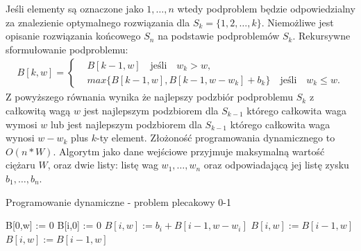 Jeśli elementy są oznaczone jako $1,\dots,n$ wtedy podproblem będzie odpowiedzialny za znalezienie optymalnego rozwiązania dla $S_k = \{1,2,\dots,k \}$. Niemożliwe jest opisanie rozwiązania końcowego $S_n$ na podstawie podproblemów $S_k$. Rekursywne sformułowanie podproblemu:
\begin{equation}\label{recursiveDynamic}
  \begin{aligned}
    B[k,w] =
    \begin{cases}
    & B[k-1,w] \quad \textrm{jeśli} \quad w_k > w, \\
    & max\{B[k-1,w], B[k-1,w-w_k] + b_k\} \quad \textrm{jeśli} \quad  w_k \le w.
    \end{cases}
  \end{aligned}
\end{equation}
Z powyższego równania wynika że najlepszy podzbiór podproblemu $S_k$ z całkowitą wagą $w$ jest najlepszym podzbiorem dla $S_{k-1}$ którego całkowita waga wymosi $w$ lub jest najlepszym podzbiorem dla $S_{k-1}$ którego całkowita waga wynosi $w-w_k$ plus $k$-ty element. Złożoność programowania dynamicznego to $O(n*W)$. Algorytm jako dane wejściowe przyjmuje maksymalną wartość ciężaru $W$, oraz dwie listy: listę wag $w_1,\dots,w_n$ oraz odpowiadającą jej listę zysku $b_1,\dots,b_n$.
\begin{algorithm}
  \caption{Programowanie dynamiczne - problem plecakowy 0-1}
  \begin{algorithmic}[1]
      \State B[0,w] := 0
    \EndFor
      \State B[i,0] := 0
    \EndFor
            \State $B[i,w] := b_i + B[i-1,w-w_i]$
          \Else
            \State $B[i,w] := B[i-1,w]$
          \EndIf
        \Else
          \State $B[i,w] := B[i-1,w]$
        \EndIf
      \EndFor
    \EndFor
  \end{algorithmic}
\end{algorithm}
